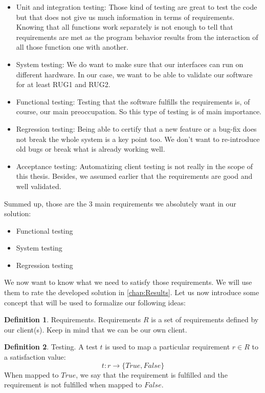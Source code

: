 \documentclass[12pt]{article}
\theoremstyle{definition}
\newtheorem{definition}{Definition}[section]
\theoremstyle{definition}
\theoremstyle{remark}
\begin{document}
\begin{itemize}
\item Unit and integration testing: Those kind of testing are great to test the code but that does not give us much information in terms of requirements. Knowing that all functions work separately is not enough to tell that requirements are met as the program behavior results from the interaction of all those function one with another.
\item System testing: We do want to make sure that our interfaces can run on different hardware. In our case, we want to be able to validate our software for at least RUG1 and RUG2.
\item Functional testing: Testing that the software fulfills the requirements is, of course, our main preoccupation. So this type of testing is of main importance.
\item Regression testing: Being able to certify that a new feature or a bug-fix does not break the whole system is a key point too. We don't want to re-introduce old bugs or break what is already working well.
\item Acceptance testing: Automatizing client testing is not really in the scope of this thesis. Besides, we assumed earlier that the requirements are good and well validated.
\end{itemize}

Summed up, those are the 3 main requirements we absolutely want in our solution:

\begin{itemize}
\item Functional testing
\item System testing
\item Regression testing
\end{itemize}

We now want to know what we need to satisfy those requirements. We will use them to rate the developed solution in \autoref{chap:Results}. Let us now introduce some concept that will be used to formalize our following ideas:

\theoremstyle{definition}
\begin{definition}{Requirements.} Requirements $R$ is a set of requirements defined by our client(s). Keep in mind that we can be our own client.
\end{definition}

\theoremstyle{definition}\label{def:Testing}
\begin{definition}{Testing.} A test $t$ is used to map a particular requirement $r \in R$ to a satisfaction value:
$$
t: r \to \{True, False\}
$$
When mapped to $True$, we say that the requirement is fulfilled and the requirement is not fulfilled when mapped to $False$.
\end{definition}
\end{document}
